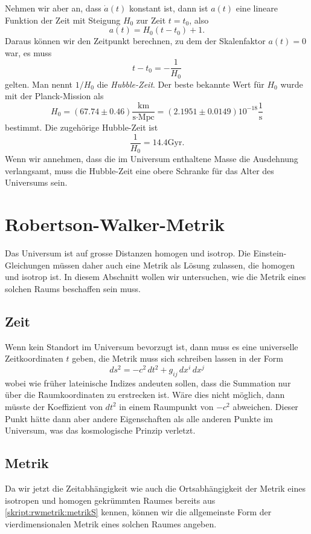 Nehmen wir aber an, dass $\dot a(t)$ konstant ist, dann ist $a(t)$
eine lineare Funktion der Zeit mit Steigung  $H_0$ zur Zeit $t=t_0$,
also
\[
a(t)=H_0(t-t_0) + 1.
\]
Daraus können wir den Zeitpunkt berechnen, zu dem der Skalenfaktor
$a(t)=0$ war, es muss
\[
t-t_0 = -\frac1{H_0}
\]
gelten.
Man nennt $1/H_0$ die {\em Hubble-Zeit}.
Der beste bekannte Wert für $H_0$ wurde mit der Planck-Mission als
\begin{equation}
H_0
=
(67.74 \pm 0.46)\frac{\text{km}}{\text{s}\cdot\text{Mpc}}
=
(2.1951\pm 0.0149)
10^{-18}\frac{1}{\text{s}}
\label{skript:robertson:hubble0}
\end{equation}
bestimmt.
Die zugehörige Hubble-Zeit ist
\begin{equation}
\frac{1}{H_0} = 14.4\text{Gyr}.
\label{skript:robertson:hubblezeit}
\end{equation}
Wenn wir annehmen, dass die im Universum enthaltene Masse die Ausdehnung
verlangsamt, muss die Hubble-Zeit eine obere Schranke für das Alter
des Universums sein.

\section{Robertson-Walker-Metrik}
Das Universum ist auf grosse Distanzen homogen und isotrop.
Die Einstein-Gleichungen müssen daher auch eine Metrik als
Lösung zulassen, die homogen und isotrop ist.
In diesem Abschnitt wollen wir untersuchen, wie die Metrik eines
solchen Raums beschaffen sein muss.

\subsection{Zeit}
Wenn kein Standort im Universum bevorzugt ist, dann muss es
eine universelle Zeitkoordinaten $t$ geben, die Metrik muss
sich schreiben lassen in der Form
\[
ds^2
=
-c^2\,dt^2
+
g_{ij}\,dx^i\,dx^j
\]
wobei wie früher lateinische Indizes andeuten sollen, dass die
Summation nur über die Raumkoordinaten zu erstrecken ist.
Wäre dies nicht möglich, dann müsste der Koeffizient von $dt^2$
in einem Raumpunkt von $-c^2$ abweichen.
Dieser Punkt hätte dann aber andere Eigenschaften als alle anderen
Punkte im Universum, was das kosmologische Prinzip verletzt.

\subsection{Metrik}
Da wir jetzt die Zeitabhängigkeit wie auch die Ortsabhängigkeit der
Metrik eines isotropen und homogen gekrümmten Raumes bereits aus
\eqref{skript:rwmetrik:metrikS} kennen, können
wir die allgemeinste Form der vierdimensionalen Metrik eines solchen
Raumes angeben.

